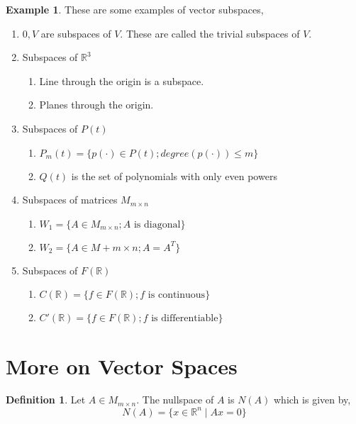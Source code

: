 \documentclass{report}
\theoremstyle{definition}
\newtheorem*{_def}{Definition}
\newtheorem{ex}{Example}[section]
\theoremstyle{remark}
\begin{document}
\begin{ex}
These are some examples of vector subspaces,
\begin{enumerate}
 \item ${0}, V$ are subspaces of $V$.
 These are called the trivial subspaces of $V$.
 \item Subspaces of $\mathbb{R}^3$
 \begin{enumerate}[i]
  \item Line through the origin is a subspace.
  \item Planes through the origin.
 \end{enumerate}
 \item Subspaces of $P(t)$
 \begin{enumerate}[i]
  \item $P_m(t)=\{p(\cdot)\in P(t); degree(p(\cdot))\leq m\}$
  \item $Q(t)$ is the set of polynomials with only even powers
 \end{enumerate}
 \item Subspaces of matrices $M_{m\times n}$
 \begin{enumerate}[i]
  \item $W_1=\{A\in M_{m\times n}; A \text{ is diagonal}\}$
  \item $W_2=\{A\in M+{m\times n}; A=A^T\}$
 \end{enumerate}
 \item Subspaces of $F(\mathbb{R})$
 \begin{enumerate}[i]
  \item $C(\mathbb{R})=\{f\in F(\mathbb{R}); f \text{ is continuous}\}$
  \item $C'(\mathbb{R})=\{f\in F(\mathbb{R}); f \text{ is differentiable}\}$
 \end{enumerate}
\end{enumerate}
\end{ex}

\section{More on Vector Spaces}

\begin{_def}
Let $A\in M_{m\times n}$. The nullspace of $A$ is $N(A)$ which is given by,
\[N(A)=\{x\in \mathbb{R}^n \mid Ax=0\}\]
\end{_def}
\end{document}
